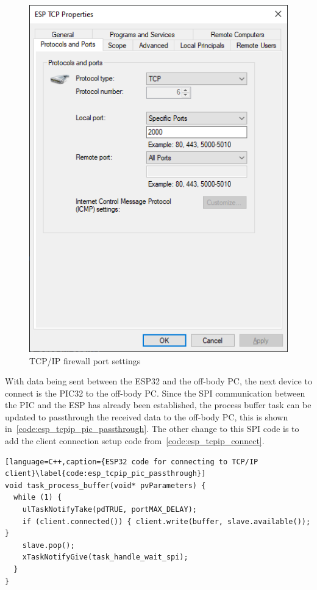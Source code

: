\begin{figure}[!ht]
  \caption{TCP/IP firewall port settings}\label{fig:firewall}
  \centering
  \includegraphics[width=1\columnwidth/2]{chapters/development/FIREWALL}
\end{figure}

With data being sent between the ESP32 and the off-body PC, the next device to connect is the PIC32 to the off-body PC.
Since the SPI communication between the PIC and the ESP has already been established,
the process buffer task can be updated to passthrough the received data to the off-body PC, this is shown in~\autoref{code:esp_tcpip_pic_passthrough}.
The other change to this SPI code is to add the client connection setup code from~\autoref{code:esp_tcpip_connect}.

\begin{lstlisting}[language=C++,caption={ESP32 code for connecting to TCP/IP client}\label{code:esp_tcpip_pic_passthrough}]
void task_process_buffer(void* pvParameters) {
  while (1) {
    ulTaskNotifyTake(pdTRUE, portMAX_DELAY);
    if (client.connected()) { client.write(buffer, slave.available()); }
    slave.pop();
    xTaskNotifyGive(task_handle_wait_spi);
  }
}
\end{lstlisting}


